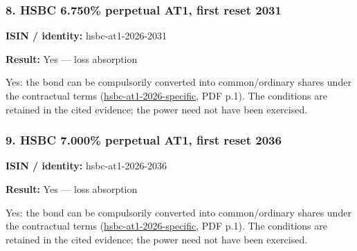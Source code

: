 \documentclass[
  11pt,
]{article}
\begin{document}
\begin{minipage}{\linewidth}

\hypertarget{hsbc-6.750-perpetual-at1-first-reset-2031}{%
\subsubsection{8. HSBC 6.750\% perpetual AT1, first reset
2031}\label{hsbc-6.750-perpetual-at1-first-reset-2031}}

\textbf{ISIN / identity:} hsbc-at1-2026-2031

\textbf{Result:} Yes --- loss absorption

Yes: the bond can be compulsorily converted into common/ordinary shares
under the contractual terms
(\href{https://www.hsbc.com/-/files/hsbc/investors/fixed-income-investors/fixed-income-securities/hsbc-holdings/1/hsbc-holdings-plc-project-portland-final-prospectus-supplement.pdf}{hsbc-at1-2026-specific},
PDF p.1). The conditions are retained in the cited evidence; the power
need not have been exercised.

\end{minipage}
\par\addvspace{1.1em}

\begin{minipage}{\linewidth}

\hypertarget{hsbc-7.000-perpetual-at1-first-reset-2036}{%
\subsubsection{9. HSBC 7.000\% perpetual AT1, first reset
2036}\label{hsbc-7.000-perpetual-at1-first-reset-2036}}

\textbf{ISIN / identity:} hsbc-at1-2026-2036

\textbf{Result:} Yes --- loss absorption

Yes: the bond can be compulsorily converted into common/ordinary shares
under the contractual terms
(\href{https://www.hsbc.com/-/files/hsbc/investors/fixed-income-investors/fixed-income-securities/hsbc-holdings/1/hsbc-holdings-plc-project-portland-final-prospectus-supplement.pdf}{hsbc-at1-2026-specific},
PDF p.1). The conditions are retained in the cited evidence; the power
need not have been exercised.

\end{minipage}
\par\addvspace{1.1em}
\end{document}
